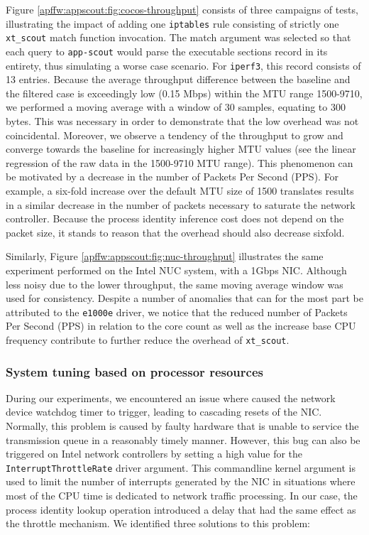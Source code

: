 Figure \ref{apffw:appscout:fig:cocos-throughput} consists of three campaigns of tests, illustrating the impact of adding one \texttt{iptables} rule consisting of strictly one \texttt{xt\_scout} match function invocation. The match argument was selected so that each query to \texttt{app-scout} would parse the executable sections record in its entirety, thus simulating a worse case scenario. For \texttt{iperf3}, this record consists of 13 entries. Because the average throughput difference between the baseline and the filtered case is exceedingly low (0.15 Mbps) within the MTU range 1500-9710, we performed a moving average with a window of 30 samples, equating to 300 bytes. This was necessary in order to demonstrate that the low overhead was not coincidental. Moreover, we observe a tendency of the \scout{} throughput to grow and converge towards the baseline for increasingly higher MTU values (see the linear regression of the raw data in the 1500-9710 MTU range). This phenomenon can be motivated by a decrease in the number of Packets Per Second (PPS). For example, a six-fold increase over the default MTU size of 1500 translates results in a similar decrease in the number of packets necessary to saturate the network controller. Because the process identity inference cost does not depend on the packet size, it stands to reason that the \scout{} overhead should also decrease sixfold.

Similarly, Figure \ref{apffw:appscout:fig:nuc-throughput} illustrates the same experiment performed on the Intel NUC system, with a 1Gbps NIC. Although less noisy due to the lower throughput, the same moving average window was used for consistency. Despite a number of anomalies that can for the most part be attributed to the \texttt{e1000e} driver, we notice that the reduced number of Packets Per Second (PPS) in relation to the core count as well as the increase base CPU frequency contribute to further reduce the overhead of \texttt{xt\_scout}.



\subsubsection{System tuning based on processor resources}
\label{subsec:tuning}

During our experiments, we encountered an issue where \scout{} caused the network device watchdog timer to trigger, leading to cascading resets of the NIC. Normally, this problem is caused by faulty hardware that is unable to service the transmission queue in a reasonably timely manner. However, this bug can also be triggered on Intel network controllers by setting a high value for the \texttt{InterruptThrottleRate} driver argument. This commandline kernel argument is used to limit the number of interrupts generated by the NIC in situations where most of the CPU time is dedicated to network traffic processing. In our case, the process identity lookup operation introduced a delay that had the same effect as the throttle mechanism. We identified three solutions to this problem:

